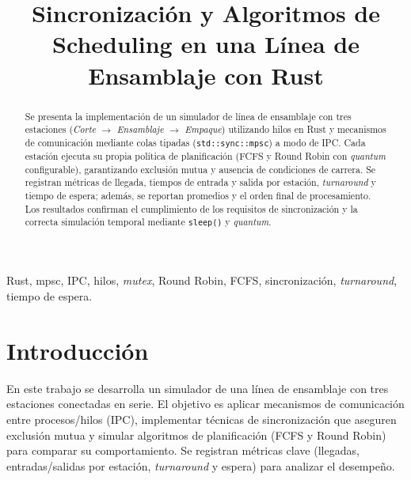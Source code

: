 \documentclass[conference]{IEEEtran}
\begin{document}
\title{Sincronización y Algoritmos de Scheduling en una Línea de Ensamblaje con Rust\\}

\author{
\and
{}
}

\maketitle

\begin{abstract}
Se presenta la implementación de un simulador de línea de ensamblaje con tres estaciones (\textit{Corte} $\rightarrow$ \textit{Ensamblaje} $\rightarrow$ \textit{Empaque}) utilizando hilos en Rust y mecanismos de comunicación mediante colas tipadas (\texttt{std::sync::mpsc}) a modo de IPC. Cada estación ejecuta su propia política de planificación (FCFS y Round Robin con \textit{quantum} configurable), garantizando exclusión mutua y ausencia de condiciones de carrera. Se registran métricas de llegada, tiempos de entrada y salida por estación, \textit{turnaround} y tiempo de espera; además, se reportan promedios y el orden final de procesamiento. Los resultados confirman el cumplimiento de los requisitos de sincronización y la correcta simulación temporal mediante \texttt{sleep()} y \textit{quantum}.
\end{abstract}

\begin{IEEEkeywords}
Rust, mpsc, IPC, hilos, \textit{mutex}, Round Robin, FCFS, sincronización, \textit{turnaround}, tiempo de espera.
\end{IEEEkeywords}

\section{Introducción}
En este trabajo se desarrolla un simulador de una línea de ensamblaje con tres estaciones conectadas en serie. El objetivo es aplicar mecanismos de comunicación entre procesos/hilos (IPC), implementar técnicas de sincronización que aseguren exclusión mutua y simular algoritmos de planificación (FCFS y Round Robin) para comparar su comportamiento. Se registran métricas clave (llegadas, entradas/salidas por estación, \textit{turnaround} y espera) para analizar el desempeño.
\end{document}

